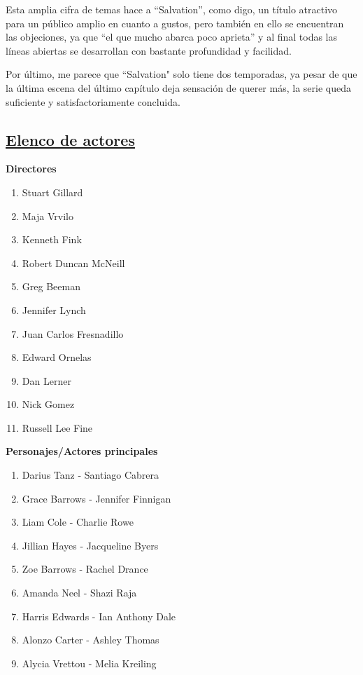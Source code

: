 \documentclass[a5paper,11pt]{article}
\begin{document}
{    Esta amplia cifra de temas hace a ``Salvation'', como digo, un título atractivo para un público amplio en cuanto a gustos, pero también en ello se encuentran las objeciones, ya que ``el que mucho abarca poco aprieta'' y al final todas las líneas abiertas
    se desarrollan con bastante profundidad y facilidad.
    
    Por último, me parece que ``Salvation" solo tiene dos temporadas, ya pesar de que la última escena del último capítulo deja sensación de querer más, la serie queda suficiente y satisfactoriamente concluida.}
    
    \subsection{\large{\underline{Elenco de actores}}} \small{
    \setlength{\parindent}{0pt}\HandRight\textbf{ Directores}
    
\begin{enumerate}
    
    \item Stuart Gillard
    \item Maja Vrvilo
    \item Kenneth Fink
    \item Robert Duncan McNeill
    \item Greg Beeman
    \item Jennifer Lynch
    \item Juan Carlos Fresnadillo
    \item Edward Ornelas
    \item Dan Lerner
    \item Nick Gomez
    \item Russell Lee Fine
    
\end{enumerate}  

    \setlength{\parindent}{0pt}\HandRight\textbf{ Personajes/Actores principales}
    
\begin{enumerate}
    \item Darius Tanz - Santiago Cabrera
    \item Grace Barrows - Jennifer Finnigan
    \item Liam Cole - Charlie Rowe
    \item Jillian Hayes - Jacqueline Byers
    \item Zoe Barrows - Rachel Drance
    \item Amanda Neel - Shazi Raja 
    \item Harris Edwards - Ian Anthony Dale
    \item Alonzo Carter - Ashley Thomas 
    \item Alycia Vrettou - Melia Kreiling
    

\end{enumerate}}
\end{document}
